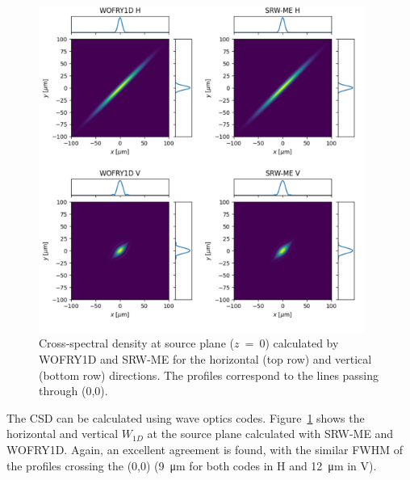 \documentclass[preprint]{iucr}
\begin{document}
\begin{figure}
    \label{fig:plot_CSD_at_source}
    \includegraphics[width=0.95\textwidth]{figures/plot_CSD_at_source.pdf}
    \caption{Cross-spectral density at source plane ($z$~=~0) calculated by WOFRY1D and SRW-ME for the horizontal (top row) and vertical (bottom row) directions.
    The profiles correspond to the lines passing through (0,0).
    }
\end{figure}

The CSD can be calculated using wave optics codes. 
Figure~\ref{fig:plot_CSD_at_source} shows the horizontal and vertical $W_{1D}$ at the source plane calculated with SRW-ME and WOFRY1D.
Again, an excellent agreement is found, with the similar FWHM of the profiles crossing the (0,0) (\SI{9}{\micro\meter} for both codes in H and \SI{12}{\micro\meter} in V).
\end{document}
